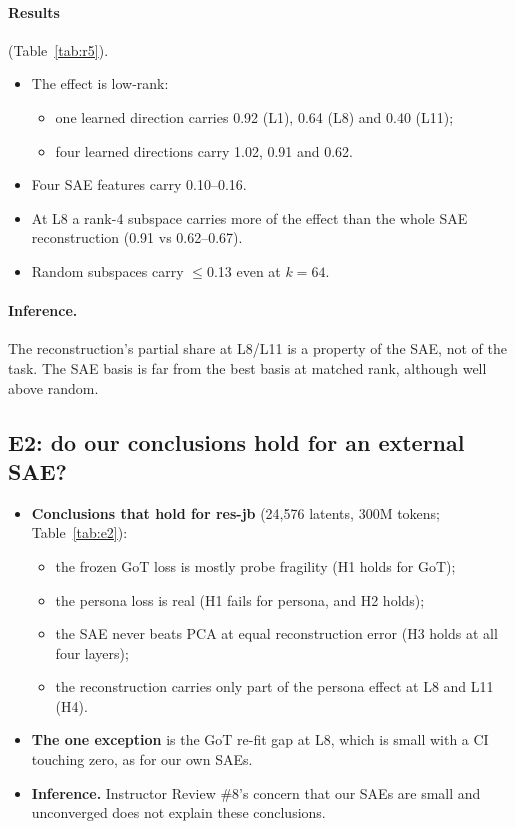 \paragraph{Results} (Table~\ref{tab:r5}).
\begin{itemize}
\item The effect is low-rank:
  \begin{itemize}
  \item one learned direction carries 0.92 (L1), 0.64 (L8) and 0.40 (L11);
  \item four learned directions carry 1.02, 0.91 and 0.62.
  \end{itemize}
\item Four SAE features carry 0.10--0.16.
\item At L8 a rank-4 subspace carries more of the effect than the whole SAE reconstruction (0.91 vs 0.62--0.67).
\item Random subspaces carry $\leq$0.13 even at $k=64$.
\end{itemize}

\paragraph{Inference.} The reconstruction's partial share at L8/L11 is a property of the SAE, not of the task. The SAE
basis is far from the best basis at matched rank, although well above random.



\subsection{E2: do our conclusions hold for an external SAE?}\label{sec:e2}

\begin{itemize}
\item \textbf{Conclusions that hold for res-jb} (24,576 latents, 300M tokens; Table~\ref{tab:e2}):
  \begin{itemize}
  \item the frozen GoT loss is mostly probe fragility (H1 holds for GoT);
  \item the persona loss is real (H1 fails for persona, and H2 holds);
  \item the SAE never beats PCA at equal reconstruction error (H3 holds at all four layers);
  \item the reconstruction carries only part of the persona effect at L8 and L11 (H4).
  \end{itemize}
\item \textbf{The one exception} is the GoT re-fit gap at L8, which is small with a CI touching zero, as for our own
  SAEs.
\item \textbf{Inference.} Instructor Review \#8's concern that our SAEs are small and unconverged does not explain
  these conclusions.
\end{itemize}

